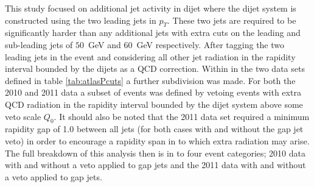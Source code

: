 	This study focused on additional jet activity in dijet where the dijet system
	is constructed using the two leading jets in $p_T$.  These two jets are required
	to be significantly harder than any additional jets with extra cuts on the leading
	and sub-leading jets of $50$~GeV and $60$~GeV respectively.  After tagging the two
	leading jets in the event and considering all other jet radiation in the rapidity
	interval bounded by the dijets as a QCD correction.  Within in the two data sets
	defined in table \ref{tab:atlasPcuts} a further subdivision was made.  For both the
	2010 and 2011 data a subset of events was defined by vetoing events with extra
	QCD radiation in the rapidity interval bounded by the dijet system above some veto
	scale $Q_0$.  It should also be noted that the 2011 data set required a minimum
	rapidity gap of 1.0 between all jets (for both cases with and without the gap jet
	veto) in order to encourage a rapidity span in to which extra radiation may arise.
	The full breakdown of this analysis then is in to four event categories;
	2010 data with and without a veto applied to gap jets and the 2011 data with and
	without a veto applied to gap jets.

